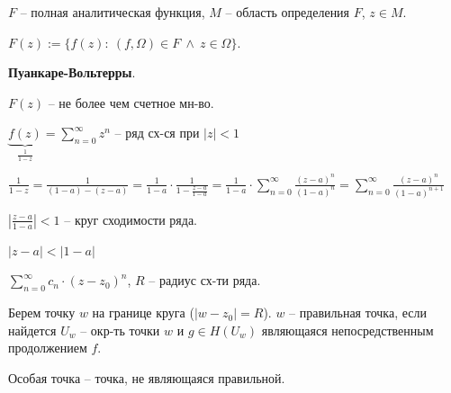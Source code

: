 \begin{definition}
    $F$ -- полная аналитическая функция, $M$ -- область определения $F$, $z \in M$.

    $F(z) := \{ f(z): \ (f, \Omega) \in F \ \land \ z \in \Omega \}$.
\end{definition}

\begin{theorem}
    \textbf{Пуанкаре-Вольтерры}.

    $F(z)$ -- не более чем счетное мн-во.
\end{theorem}

\begin{example}
    $\underbrace{f(z)}_{\frac{1}{1-z}} = \sum_{n=0}^{\infty} {z^n}$ -- ряд сх-ся при $|z| < 1$


    $\frac{1}{1 - z} = \frac{1}{(1-a) - (z - a)} = \frac{1}{1-a} \cdot \frac{1}{1 - \frac{z-a}{1-a}} = \frac{1}{1-a} \cdot \sum_{n=0}^{\infty} { \frac{(z-a)^n}{(1-a)^n} } = \sum_{n=0}^{\infty} { \frac{(z-a)^n}{(1-a)^{n+1}} }$

    $\left| \frac{z-a}{1-a} \right| < 1$ -- круг сходимости ряда.

    $|z-a| < |1-a|$

\end{example}


\begin{definition}
    $\sum_{n=0}^{\infty} { c_n \cdot (z - z_0)^n }$, $R$ -- радиус сх-ти ряда.


    Берем точку $w$ на границе круга ($|w - z_0| = R$). $w$ -- правильная точка, если найдется $U_w$ -- окр-ть точки $w$ и $g \in H(U_w)$ являющаяся непосредственным продолжением $f$.
\end{definition}

\begin{definition}
    Особая точка -- точка, не являющаяся правильной.
\end{definition}

